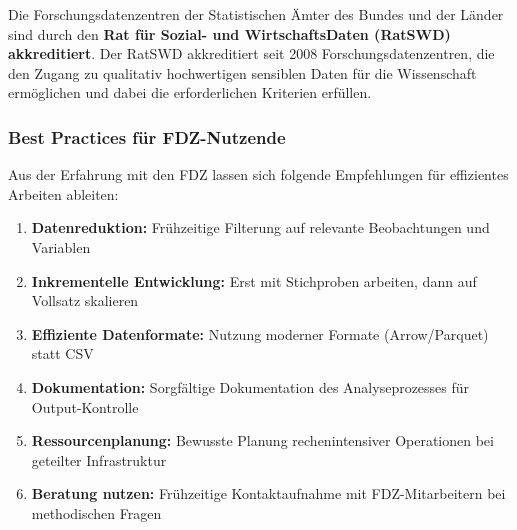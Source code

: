 \documentclass[
  german,
  10pt,
  twoside]{article}
\providecommand{\tightlist}{%
  \setlength{\itemsep}{0pt}\setlength{\parskip}{0pt}}
\begin{document}
Die Forschungsdatenzentren der Statistischen Ämter des Bundes und der
Länder sind durch den \textbf{Rat für Sozial- und WirtschaftsDaten
(RatSWD) akkreditiert}. Der RatSWD akkreditiert seit 2008
Forschungsdatenzentren, die den Zugang zu qualitativ hochwertigen
sensiblen Daten für die Wissenschaft ermöglichen und dabei die
erforderlichen Kriterien erfüllen.

\subsubsection{Best Practices für
FDZ-Nutzende}\label{best-practices-fuxfcr-fdz-nutzende}

Aus der Erfahrung mit den FDZ lassen sich folgende Empfehlungen für
effizientes Arbeiten ableiten:

\begin{enumerate}
\def\labelenumi{\arabic{enumi}.}
\tightlist
\item
  \textbf{Datenreduktion:} Frühzeitige Filterung auf relevante
  Beobachtungen und Variablen
\item
  \textbf{Inkrementelle Entwicklung:} Erst mit Stichproben arbeiten,
  dann auf Vollsatz skalieren
\item
  \textbf{Effiziente Datenformate:} Nutzung moderner Formate
  (Arrow/Parquet) statt CSV
\item
  \textbf{Dokumentation:} Sorgfältige Dokumentation des Analyseprozesses
  für Output-Kontrolle
\item
  \textbf{Ressourcenplanung:} Bewusste Planung rechenintensiver
  Operationen bei geteilter Infrastruktur
\item
  \textbf{Beratung nutzen:} Frühzeitige Kontaktaufnahme mit
  FDZ-Mitarbeitern bei methodischen Fragen
\end{enumerate}


\printbibliography
\end{document}
